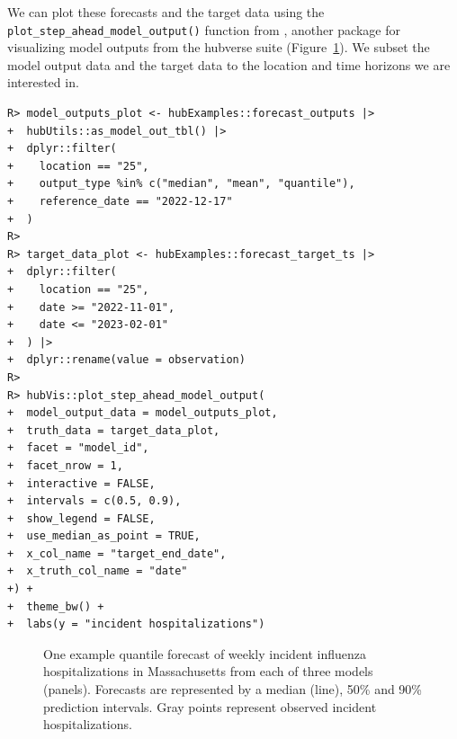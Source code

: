 \documentclass[
  article,
  shortnames,
  notitle]{jss}
\begin{document}
We can plot these forecasts and the target data using the
\texttt{plot\_step\_ahead\_model\_output()} function from ,
another package for visualizing model outputs from the hubverse suite
(Figure~\ref{fig-plot-ex-mods}). We subset the model output data and the
target data to the location and time horizons we are interested in.

\begin{verbatim}
R> model_outputs_plot <- hubExamples::forecast_outputs |>
+  hubUtils::as_model_out_tbl() |>
+  dplyr::filter(
+    location == "25",
+    output_type %in% c("median", "mean", "quantile"),
+    reference_date == "2022-12-17"
+  )
R> 
R> target_data_plot <- hubExamples::forecast_target_ts |>
+  dplyr::filter(
+    location == "25",
+    date >= "2022-11-01",
+    date <= "2023-02-01"
+  ) |>
+  dplyr::rename(value = observation)
R> 
R> hubVis::plot_step_ahead_model_output(
+  model_output_data = model_outputs_plot,
+  truth_data = target_data_plot,
+  facet = "model_id",
+  facet_nrow = 1,
+  interactive = FALSE,
+  intervals = c(0.5, 0.9),
+  show_legend = FALSE,
+  use_median_as_point = TRUE,
+  x_col_name = "target_end_date", 
+  x_truth_col_name = "date"
+) +
+  theme_bw() +
+  labs(y = "incident hospitalizations")
\end{verbatim}

\begin{figure}[H]


\caption{\label{fig-plot-ex-mods}One example quantile forecast of weekly
incident influenza hospitalizations in Massachusetts from each of three
models (panels). Forecasts are represented by a median (line), 50\% and
90\% prediction intervals. Gray points represent observed incident
hospitalizations.}

\end{figure}%
\end{document}
